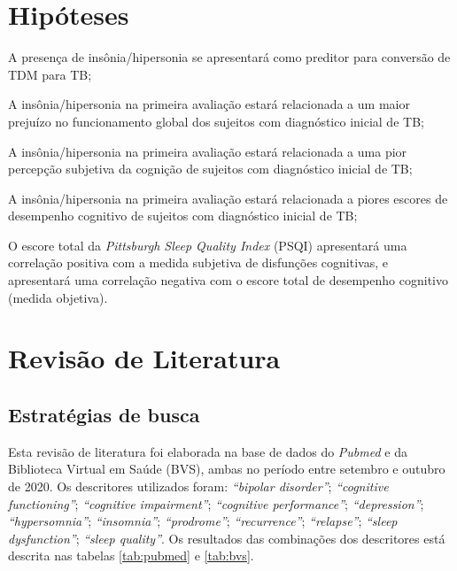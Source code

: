\documentclass[chapter=TITLE,
               oneside,
               12pt,
               a4paper,
               english,
               brazil]{abntex2}    %
\begin{document}
\vspace{\onelineskip}
\chapter{Hipóteses}\label{sec:hipoteses}

    \begin{alineas}

        \item A presença de insônia/hipersonia se apresentará como preditor
        para conversão de TDM para TB;

        \item A insônia/hipersonia na primeira avaliação estará relacionada
        a um maior prejuízo no funcionamento global dos sujeitos com diagnóstico
        inicial de TB;

        \item A insônia/hipersonia na primeira avaliação estará relacionada
        a uma pior percepção subjetiva da cognição de sujeitos com diagnóstico
        inicial de TB;

        \item A insônia/hipersonia na primeira avaliação estará relacionada
        a piores escores de desempenho cognitivo de sujeitos com diagnóstico
        inicial de TB;

        \item O escore total da \textit{Pittsburgh Sleep Quality Index} (PSQI)
        apresentará uma correlação positiva com a medida subjetiva de disfunções
        cognitivas, e apresentará uma correlação negativa com o escore total
        de desempenho cognitivo (medida objetiva).

    \end{alineas}

\vspace{\onelineskip}
\chapter{Revisão de Literatura}\label{sec:revisao}

    \section{Estratégias de busca}\label{sec:estrategias}

        Esta revisão de literatura foi elaborada na base de dados do \textit{Pubmed}
        e da Biblioteca Virtual em Saúde (BVS), ambas no período entre setembro e
        outubro de 2020.
        Os descritores utilizados foram: \textit{``bipolar disorder''};
        \textit{``cognitive functioning''}; \textit{``cognitive impairment''};
        \textit{``cognitive performance''}; \textit{``depression''};
        \textit{``hypersomnia''}; \textit{``insomnia''}; \textit{``prodrome''};
        \textit{``recurrence''}; \textit{``relapse''}; \textit{``sleep dysfunction''};
        \textit{``sleep quality''}.
        Os resultados das combinações dos descritores está descrita nas tabelas
        \ref{tab:pubmed} e \ref{tab:bvs}.
    
\end{document}
